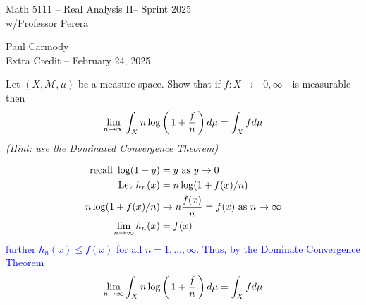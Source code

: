 \documentclass[10pt,a4paper]{report}
\newcommand{\CLASSNAME}{Math 5111 -- Real Analysis II}
\newcommand{\STUDENTNAME}{Paul Carmody}
\newcommand{\ASSIGNMENT}{Extra Credit }
\newcommand{\DUEDATE}{February 24, 2025}
\newcommand{\SEMESTER}{Sprint 2025}
\newcommand{\BLUE}[1]{\textcolor{blue}{#1}}
\begin{document}
\begin{center}
	\Large{\CLASSNAME -- \SEMESTER} \\
	\large{ w/Professor Perera}
\end{center}
\begin{center}
	\STUDENTNAME \\
	\ASSIGNMENT -- \DUEDATE\\
\end{center} 

Let $(X, \mathcal{M}, \mu)$ be a measure space. Show that if $f: X \to [0,\infty]$ is measurable then 
\begin{align*}
	\lim_{n \to \infty} \int_X n \log\left (\, 1+\frac{f}{n} \,\right ) d\mu = \int_X f d\mu 
\end{align*}\textit{(Hint: use the Dominated Convergence Theorem)}

\BLUE{\begin{align*}
	\text{recall } \log(1+y)  &= y \text{ as } y \to 0\\
	\text{Let } h_n(x) &= n \log(1+f(x)/n) \\
	n \log(1+f(x)/n) &\to n\frac{f(x)}{n} = f(x) \text{ as } n\to \infty \\
	\lim_{n \to \infty} h_n(x) &=  f(x)
\end{align*}further $h_n(x) \le f(x)$ for all $n=1, \dots, \infty$.  Thus, by the Dominate Convergence Theorem 
\begin{align*}
	\lim_{n \to \infty} \int_X n \log\left (\, 1+\frac{f}{n} \,\right ) d\mu = \int_X f d\mu 
\end{align*}
}
\end{document}
